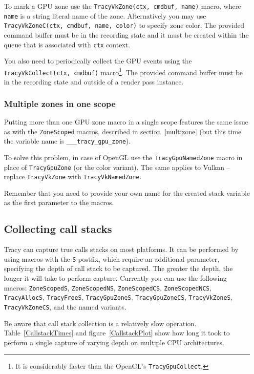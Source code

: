 \documentclass[hidelinks,titlepage,a4paper]{article}
\begin{document}
To mark a GPU zone use the \texttt{TracyVkZone(ctx, cmdbuf, name)} macro, where \texttt{name} is a string literal name of the zone. Alternatively you may use \texttt{TracyVkZoneC(ctx, cmdbuf, name, color)} to specify zone color. The provided command buffer must be in the recording state and it must be created within the queue that is associated with \texttt{ctx} context.

You also need to periodically collect the GPU events using the \texttt{TracyVkCollect(ctx, cmdbuf)} macro\footnote{It is considerably faster than the OpenGL's \texttt{TracyGpuCollect}.}. The provided command buffer must be in the recording state and outside of a render pass instance.

\subsubsection{Multiple zones in one scope}

Putting more than one GPU zone macro in a single scope features the same issue as with the \texttt{ZoneScoped} macros, described in section~\ref{multizone} (but this time the variable name is \texttt{\_\_\_tracy\_gpu\_zone}).

To solve this problem, in case of OpenGL use the \texttt{TracyGpuNamedZone} macro in place of \texttt{TracyGpuZone} (or the color variant). The same applies to Vulkan -- replace \texttt{TracyVkZone} with \texttt{TracyVkNamedZone}.

Remember that you need to provide your own name for the created stack variable as the first parameter to the macros.

\subsection{Collecting call stacks}
\label{collectingcallstacks}

Tracy can capture true calls stacks on most platforms. It can be performed by using macros with the \texttt{S} postfix, which require an additional parameter, specifying the depth of call stack to be captured. The greater the depth, the longer it will take to perform capture. Currently you can use the following macros: \texttt{ZoneScopedS}, \texttt{ZoneScopedNS}, \texttt{ZoneScopedCS}, \texttt{ZoneScopedNCS}, \texttt{TracyAllocS}, \texttt{TracyFreeS}, \texttt{TracyGpuZoneS}, \texttt{TracyGpuZoneCS}, \texttt{TracyVkZoneS}, \texttt{TracyVkZoneCS}, and the named variants.

Be aware that call stack collection is a relatively slow operation. Table~\ref{CallstackTimes} and figure~\ref{CallstackPlot} show how long it took to perform a single capture of varying depth on multiple CPU architectures.
\end{document}

